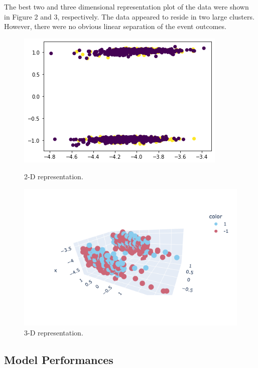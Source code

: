 \documentclass{article}
\begin{document}
The best two and three dimensional representation plot of the data were shown in Figure 2 and 3, respectively. The data appeared to reside in two large clusters. However, there were no obvious linear separation of the event outcomes.

\begin{figure}
\centering
\begin{minipage}{.5\textwidth}
  \centering
  \includegraphics[width=.8\linewidth]{index.png}
  \caption{2-D representation.}
  \label{fig:test1}
\end{minipage}%
\begin{minipage}{.5\textwidth}
  \centering
  \includegraphics[width=1.1\linewidth]{newplot(8).png}
  \caption{3-D representation.}
  \label{fig:test2}
\end{minipage}
\end{figure}

\subsection{Model Performances}
\end{document}
